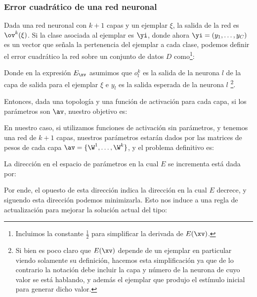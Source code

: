 \subsubsection{Error cuadrático de una red neuronal}

Dada una red neuronal con $k+1$ capas  y un ejemplar $\xi$, la salida de la red es $\ov^k(\xi)$. Si la clase asociada al ejemplar es $\yi$, donde ahora $\yi=(y_1,\dots,y_C)$ es un vector que señala la pertenencia del ejemplar a cada clase, podemos definir el error cuadrático la red sobre un conjunto de datos $D$ como\footnote{Incluimos la constante $\frac{1}{2}$ para simplificar la derivada de $E(\xv)$.}:



Donde en la expresión $E_{\xv}$ asumimos que $o^k_l$ es la salida de la neurona $l$ de la capa de salida para el ejemplar $\xi$ e $y_l$ es la salida esperada de la neurona $l$ \footnote{Si bien es poco claro que $E(\xv)$ depende de un ejemplar en particular viendo solamente su definición, hacemos esta simplificación ya que de lo contrario la notación debe incluir la capa y número de la neurona de cuyo valor se está hablando, y además el ejemplar que produjo el estímulo inicial para generar dicho valor.}. 

Entonces, dada una topología y una función de activación para cada capa, si los parámetros son $\av$, nuestro objetivo es:



En nuestro caso, si utilizamos funciones de activación sin parámetros, y tenemos una red de $k+1$ capas, nuestros parámetros estarán dados por las matrices de 
pesos de cada capa $\av=\{\W^1,\dots,\W^k\}$, y el problema definitivo es:




La dirección en el espacio de parámetros en la cual $E$ se incrementa está dada por:


Por ende, el opuesto de esta dirección indica la dirección en la cual $E$ decrece, y siguendo esta dirección podemos minimizarla. Esto nos induce a una regla de actualización para mejorar la solución actual del tipo:


